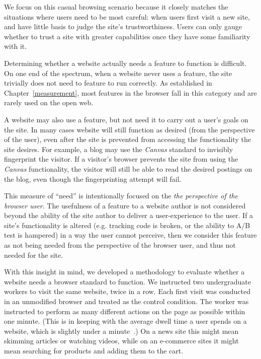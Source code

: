 We focus on this casual browsing scenario because it closely matches the
situations where users need to be most careful: when users first visit a new
site, and have little basis to judge the site's trustworthiness.
Users can only gauge whether to trust a site with greater
capabilities once they have some familiarity with it.

Determining whether a website actually needs a feature to function is difficult.
On one end of the spectrum, when a website never uses a feature, the
site trivially does not need to feature to run correctly.  As established in
Chapter~\ref{measurement}, most features in the browser fall in this category
and are rarely used on the open web.

A website may also use a feature, but not need it to carry out a user's
goals on the site.  In many cases website will still function as desired (from
the perspective of the user), even after the site is prevented from accessing
the functionality the site desires.  For example, a blog may use the
\textit{Canvas} standard to invisibly fingerprint the visitor.  If a visitor's
browser prevents the site from using the \textit{Canvas} functionality, the
visitor will still be able to read the desired postings on the blog, even
though the fingerprinting attempt will fail.

This measure of ``need'' is intentionally focused on the \emph{the perspective
of the browser user}.  The usefulness of a feature to a website author is not
considered beyond the ability of the site author to deliver a user-experience
to the user. If a site's functionality is altered (e.g. tracking code is
broken, or the ability to A/B test is hampered) in a way the user cannot
perceive, then we consider this feature as not being needed from the
perspective of the browser user, and thus not needed for the site.

With this insight in mind, we developed a methodology to evaluate whether a
website needs a browser standard to function. We instructed two undergraduate
workers to visit the same website, twice in a row. Each first visit was
conducted in an unmodified \FF browser and treated as the control condition.
The worker was instructed to perform as many different actions on the page as
possible within one minute. (This is in keeping with the average dwell time a
user spends on a website, which is slightly under a
minute~\cite{liu2010understanding}.) On a news site this might mean skimming
articles or watching videos, while on an e-commerce sites it might mean
searching for products and adding them to the cart.

